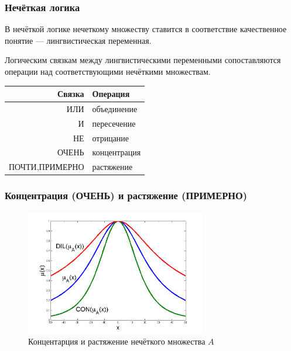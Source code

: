 \begin{frame}
    \frametitle{Нечёткая логика}
    
    \begin{definition}
        В нечёткой логике нечеткому множеству ставится в соответствие качественное понятие --- \alert{лингвистическая переменная}. 
    \end{definition}
    
    Логическим связкам между лингвистическими переменными сопоставляются операции над соответствующими нечёткими множествам.
    \begin{center}
        \begin{tabular}{r|l}
            \hline\hline 
            Связка          & Операция    \\  \hline\hline 
            ИЛИ             & объединение   \\
            И               & пересечение   \\
            НЕ              & отрицание     \\
            ОЧЕНЬ           & концентрация  \\
            ПОЧТИ,ПРИМЕРНО  & растяжение    \\
            \hline
        \end{tabular}
    \end{center}
\end{frame}


\begin{frame}
    \frametitle{Концентрация (ОЧЕНЬ) и растяжение (ПРИМЕРНО)}
    
    \begin{figure}[!ht]
        \centering
        \includegraphics[width=0.7\textwidth]{fig/fuzzyConDil}
        \caption{Концентарция и растяжение нечёткого множества $A$}
        \label{fig:fuz:fuzzyConDil}
    \end{figure} 
\end{frame}

